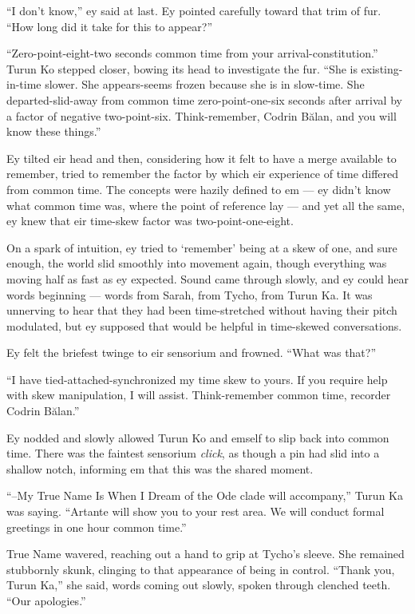 ``I don't know,'' ey said at last. Ey pointed carefully toward that trim of fur. ``How long did it take for this to appear?''

``Zero-point-eight-two seconds common time from your arrival-constitution.'' Turun Ko stepped closer, bowing its head to investigate the fur. ``She is existing-in-time slower. She appears-seems frozen because she is in slow-time. She departed-slid-away from common time zero-point-one-six seconds after arrival by a factor of negative two-point-six. Think-remember, Codrin Bălan, and you will know these things.''

Ey tilted eir head and then, considering how it felt to have a merge available to remember, tried to remember the factor by which eir experience of time differed from common time. The concepts were hazily defined to em — ey didn't know what common time was, where the point of reference lay — and yet all the same, ey knew that eir time-skew factor was two-point-one-eight.

On a spark of intuition, ey tried to `remember' being at a skew of one, and sure enough, the world slid smoothly into movement again, though everything was moving half as fast as ey expected. Sound came through slowly, and ey could hear words beginning — words from Sarah, from Tycho, from Turun Ka. It was unnerving to hear that they had been time-stretched without having their pitch modulated, but ey supposed that would be helpful in time-skewed conversations.

Ey felt the briefest twinge to eir sensorium and frowned. ``What was that?''

``I have tied-attached-synchronized my time skew to yours. If you require help with skew manipulation, I will assist. Think-remember common time, recorder Codrin Bălan.''

Ey nodded and slowly allowed Turun Ko and emself to slip back into common time. There was the faintest sensorium \emph{click}, as though a pin had slid into a shallow notch, informing em that this was the shared moment.

``--My True Name Is When I Dream of the Ode clade will accompany,'' Turun Ka was saying. ``Artante will show you to your rest area. We will conduct formal greetings in one hour common time.''

True Name wavered, reaching out a hand to grip at Tycho's sleeve. She remained stubbornly skunk, clinging to that appearance of being in control. ``Thank you, Turun Ka,'' she said, words coming out slowly, spoken through clenched teeth. ``Our apologies.''

